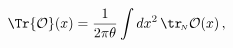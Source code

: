 \begin{equation}
\displaystyle{\Tr{\cal O}(x)=\frac{1}{2\pi\theta}\int
dx^{2}\,\tr_{\!{\scriptscriptstyle N}}{\cal O}(x)\,,}
\end{equation}

